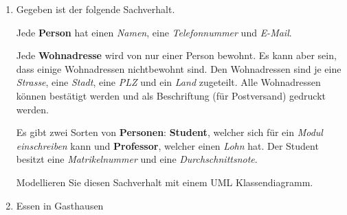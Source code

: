 \documentclass{lehramt-informatik}
\begin{document}
\begin{enumerate}
\item Gegeben ist der folgende Sachverhalt.
\cite[Seite 4]{net:pdf:uzh-zuerich:uebung-4}

Jede \textbf{Person} hat einen \emph{Namen}, eine \emph{Telefonnummer}
und \emph{E-Mail}.

Jede \textbf{Wohnadresse} wird von nur einer Person bewohnt. Es kann
aber sein, dass einige Wohnadressen nichtbewohnt sind. Den Wohnadressen
sind je eine \emph{Strasse}, eine \emph{Stadt}, eine \emph{PLZ} und ein
\emph{Land} zugeteilt. Alle Wohnadressen können bestätigt werden und als
Beschriftung (für Postversand) gedruckt werden.

Es gibt zwei Sorten von \textbf{Personen}: \textbf{Student}, welcher
sich für ein \emph{Modul einschreiben} kann und \textbf{Professor},
welcher einen \emph{Lohn} hat. Der Student besitzt eine
\emph{Matrikelnummer} und eine \emph{Durchschnittsnote}.

Modellieren Sie diesen Sachverhalt mit einem UML Klassendiagramm.


%


\item Essen in Gasthausen
\cite[Seite 4-5]{net:pdf:wikiversity:klassendiagramm}


\end{enumerate}
\end{document}
